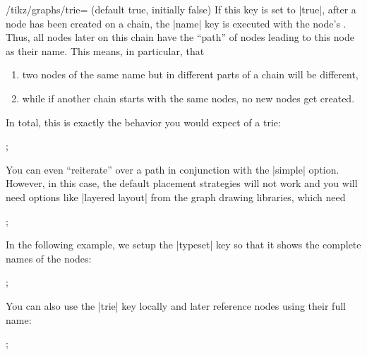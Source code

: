 \begin{key}{/tikz/graphs/trie= (default true, initially false)}
    If this key is set to |true|, after a node has been created on a chain, the
    |name| key is executed with the node's . Thus, all nodes
    later on this chain have the ``path'' of nodes leading to this node as
    their name. This means, in particular, that
    \begin{enumerate}
        \item two nodes of the same name but in different parts of a chain will
            be different,
        \item while if another chain starts with the same nodes, no new nodes
            get created.
    \end{enumerate}
    In total, this is exactly the behavior you would expect of a trie:
\begin{codeexample}[preamble={\usetikzlibrary{graphs}}]
\tikz {};
\end{codeexample}
    You can even ``reiterate'' over a path in conjunction with the |simple|
    option. However, in this case, the default placement strategies will not
    work and you will need options like |layered layout| from the graph drawing
    libraries, which need 
\ifluatex
\begin{codeexample}[preamble={\usetikzlibrary{graphs,graphdrawing}\usegdlibrary{layered}}]
\tikz {};
\end{codeexample}
    In the following example, we setup the |typeset| key so that it shows the
    complete names of the nodes:
\begin{codeexample}[preamble={\usetikzlibrary{graphs,graphdrawing}\usegdlibrary{layered}}]
\tikz {};
\end{codeexample}
\fi
    You can also use the |trie| key locally and later reference nodes using
    their full name:
\begin{codeexample}[preamble={\usetikzlibrary{graphs}}]
\tikz {};
\end{codeexample}
\end{key}


